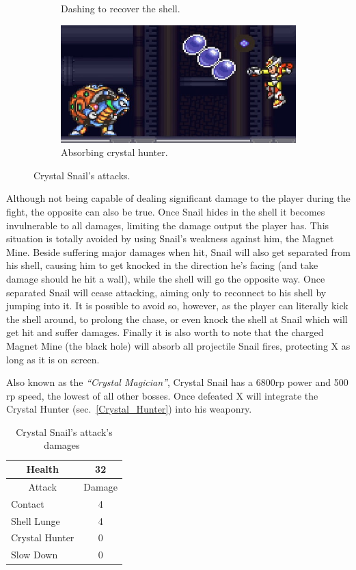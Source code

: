 \begin{figure}[htp]
\begin{subfigure}{0.45\linewidth}
		\caption{Dashing to recover the shell.}
	\end{subfigure}
	\begin{subfigure}{0.45\linewidth}
		\centering
		\includegraphics[width=\linewidth]{figures/X2/Crystal_snail/Crystal_hunter_absorb.png}
		\caption{Absorbing crystal hunter.}
	\end{subfigure}
	\caption{Crystal Snail's attacks.}	
\end{figure}
Although not being capable of dealing significant damage to the player during the fight, the opposite can also be true. Once Snail hides in the shell it becomes invulnerable to all damages, limiting the damage output the player has. This situation is totally avoided by using Snail's weakness against him, the Magnet Mine. Beside suffering major damages when hit, Snail will also get separated from his shell, causing him to get knocked in the direction he's facing (and take damage should he hit a wall), while the shell will go the opposite way. Once separated Snail will cease attacking, aiming only to reconnect to his shell by jumping into it. It is possible to avoid so, however, as the player can literally kick the shell around, to prolong the chase, or even knock the shell at Snail which will get hit and suffer damages. Finally it is also worth to note that the charged Magnet Mine (the black hole) will absorb all projectile Snail fires, protecting X as long as it is on screen.

Also known as the \textit{``Crystal Magician''}, Crystal Snail has a 6800rp power and 500 rp speed, the lowest of all other bosses. Once defeated X will integrate the Crystal Hunter (sec.~\ref{Crystal_Hunter}) into his weaponry.

\begin{table}[htp]
	\centering
	\begin{tabular}[h]{l c}
		\toprule
		\multicolumn{1}{c}{Health}  & 32 \\
		\midrule
		\multicolumn{1}{c}{Attack} & \multicolumn{1}{c}{Damage}\\
		Contact & 4 \\
		Shell Lunge & 4\\
		Crystal Hunter & 0\\
		Slow Down & 0\\
		\bottomrule
	\end{tabular}
	\caption{Crystal Snail's attack's damages~\cite{wiki:Crystal_snail}}
\end{table}

